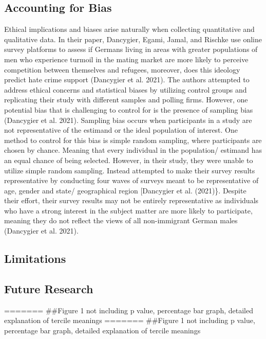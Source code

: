 \documentclass[
]{article}
\begin{document}
\hypertarget{accounting-for-bias}{%
\subsection{Accounting for Bias}\label{accounting-for-bias}}

Ethical implications and biases arise naturally when collecting
quantitative and qualitative data. In their paper, Dancygier, Egami,
Jamal, and Rischke use online survey platforms to assess if Germans
living in areas with greater populations of men who experience turmoil
in the mating market are more likely to perceive competition between
themselves and refugees, moreover, does this ideology predict hate crime
support (Dancygier et al. 2021). The authors attempted to address
ethical concerns and statistical biases by utilizing control groups and
replicating their study with different samples and polling firms.
However, one potential bias that is challenging to control for is the
presence of sampling bias (Dancygier et al. 2021). Sampling bias occurs
when participants in a study are not representative of the estimand or
the ideal population of interest. One method to control for this bias is
simple random sampling, where participants are chosen by chance. Meaning
that every individual in the population/ estimand has an equal chance of
being selected. However, in their study, they were unable to utilize
simple random sampling. Instead attempted to make their survey results
representative by conducting four waves of surveys meant to be
representative of age, gender and state/ geographical region
{[}Dancygier et al. (2021)\}. Despite their effort, their survey results
may not be entirely representative as individuals who have a strong
interest in the subject matter are more likely to participate, meaning
they do not reflect the views of all non-immigrant German males
(Dancygier et al. 2021).

\hypertarget{limitations}{%
\subsection{Limitations}\label{limitations}}

\hypertarget{future-research}{%
\subsection{Future Research}\label{future-research}}

======= \#\#Figure 1 not including p value, percentage bar graph,
detailed explanation of tercile meanings ======= \#\#Figure 1 not
including p value, percentage bar graph, detailed explanation of tercile
meanings
\end{document}
